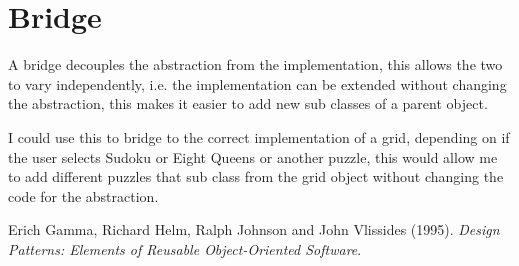 \documentclass[]{final_report}
\begin{document}
\section*{Bridge}

A bridge decouples the abstraction from the implementation, this allows the two to vary independently, i.e. the implementation can be extended without changing the abstraction, this makes it easier to add new sub classes of a parent object.

I could use this to bridge to the correct implementation of a grid, depending on if the user selects Sudoku or Eight Queens or another puzzle, this would allow me to add different puzzles that sub class from the grid object without changing the code for the abstraction.

\newpage
\begin{thebibliography}{99}
	 Erich Gamma, Richard Helm, Ralph Johnson and John Vlissides (1995). \emph{Design Patterns: Elements of Reusable Object-Oriented Software}.
\end{thebibliography}
\label{endpage}
\end{document}
